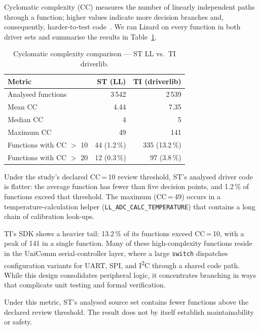 Cyclomatic complexity (CC) measures the number of linearly independent paths through a
function; higher values indicate more decision branches and, consequently, harder-to-test
code~\cite{lizard-tool}. We ran Lizard on every function in both driver sets and
summarise the results in Table~\ref{tab:ti-complexity}.

\begin{table}[H]
\centering
\caption{Cyclomatic complexity comparison --- ST LL vs.\ TI driverlib.}
\label{tab:ti-complexity}
\begin{tabular}{l r r}
\toprule
\textbf{Metric} & \textbf{ST (LL)} & \textbf{TI (driverlib)} \\
\midrule
Analysed functions       &    3\,542 &    2\,539 \\
Mean CC                  &      4.44 &      7.35 \\
Median CC                &         4 &         5 \\
Maximum CC               &        49 &       141 \\
\midrule
Functions with CC $>$ 10 &    44 \scriptsize(1.2\,\%) &   335 \scriptsize(13.2\,\%) \\
Functions with CC $>$ 20 &    12 \scriptsize(0.3\,\%) &    97 \scriptsize(3.8\,\%) \\
\bottomrule
\end{tabular}
\end{table}

Under the study's declared CC\,=\,10 review threshold, ST's analysed driver code is
flatter: the average function has fewer than five decision points, and 1.2\,\% of functions
exceed that threshold. The maximum (CC\,=\,49) occurs in a temperature-calculation
helper (\texttt{LL\_ADC\_CALC\_TEMPERATURE}) that contains a long chain of calibration
look-ups.

TI's SDK shows a heavier tail: 13.2\,\% of its functions exceed CC\,=\,10, with a peak of
141 in a single function. Many of these high-complexity functions reside in the UniComm
serial-controller layer, where a large \texttt{switch} dispatches configuration variants
for UART, SPI, and I\textsuperscript{2}C through a shared code path. While this design
consolidates peripheral logic, it concentrates branching in ways that complicate unit testing
and formal verification.

Under this metric, ST's analysed source set contains fewer functions above the declared
review threshold. The result does not by itself establish maintainability or safety.

